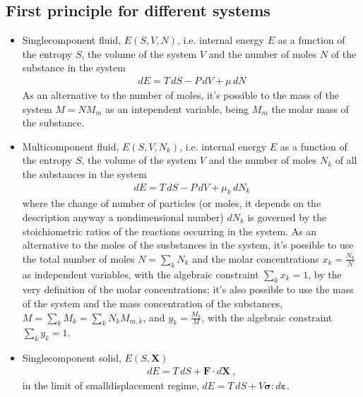 \documentclass[letterpaper,10pt,english]{jupyterBook}
\begin{document}
\subsection{First principle for different systems}
\label{\detokenize{ch/potentials:first-principle-for-different-systems}}\begin{itemize}
\item {} 
\sphinxAtStartPar
Single\sphinxhyphen{}component fluid, \(E(S, V, N)\), i.e. internal energy \(E\) as a function of the entropy \(S\), the volume of the system \(V\) and the number of moles \(N\) of the substance in the system
\begin{equation*}
\begin{split}d E = T \, d S - P \, d V + \mu \, d N\end{split}
\end{equation*}
\sphinxAtStartPar
As an alternative to the number of moles, it’s possible to the mass of the system \(M = N M_m\) as an intependent variable, being \(M_m\) the molar mass of the substance.

\item {} 
\sphinxAtStartPar
Multi\sphinxhyphen{}component fluid, \(E(S, V, N_k)\), i.e. internal energy \(E\) as a function of the entropy \(S\), the volume of the system \(V\) and the number of moles \(N_k\) of all the substances in the system
\begin{equation*}
\begin{split}d E = T \, dS - P \, d V + \mu_k \, d N_k\end{split}
\end{equation*}
\sphinxAtStartPar
where the change of number of particles (or moles, it depends on the description \sphinxhyphen{} anyway a non\sphinxhyphen{}dimensional number) \(d N_k\) is governed by the stoichiometric ratios of the reactions occurring in the system. As an alternative to the moles of the susbstances in the system, it’s possible to use the total number of moles \(N = \sum_k N_k\) and the molar concentrations \(x_k = \frac{N_k}{N}\) as independent variables, with the algebraic constraint \(\sum_k x_k = 1\), by the very definition of the molar concentrations; it’s also possible to use the mass of the system and the mass concentration of the substances, \(M = \sum_k M_k = \sum_k N_k M_{m,k}\), and \(y_k = \frac{M_k}{M}\), with the algebraic constraint \(\sum_k y_k = 1\).

\item {} 
\sphinxAtStartPar
Single\sphinxhyphen{}component solid, \(E(S, \mathbf{X})\)
\begin{equation*}
\begin{split}d E = T \, dS + \mathbf{F} \cdot d \mathbf{X} \ ,\end{split}
\end{equation*}
\sphinxAtStartPar
in the limit of small\sphinxhyphen{}displacement regime, \(d E = T \, d S + V \boldsymbol{\sigma} : d \boldsymbol{\varepsilon}\).

\end{itemize}
\end{document}
